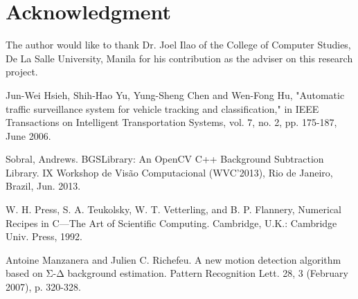 \documentclass[conference]{IEEEtran}
\begin{document}
\section*{Acknowledgment}

The author would like to thank Dr. Joel Ilao of the College of Computer Studies, De La Salle University, Manila for his contribution as the adviser on this research project.


\ifCLASSOPTIONcaptionsoff
  \newpage
\fi





%
%
%
\begin{thebibliography}{1}

Jun-Wei Hsieh, Shih-Hao Yu, Yung-Sheng Chen and Wen-Fong Hu, "Automatic traffic surveillance system for vehicle tracking and classification," in IEEE Transactions on Intelligent Transportation Systems, vol. 7, no. 2, pp. 175-187, June 2006.

Sobral, Andrews. BGSLibrary: An OpenCV C++ Background Subtraction Library. IX Workshop de Visão Computacional (WVC'2013), Rio de Janeiro, Brazil, Jun. 2013.

W. H. Press, S. A. Teukolsky, W. T. Vetterling, and B. P. Flannery, Numerical Recipes in C—The Art of Scientific Computing. Cambridge, U.K.: Cambridge Univ. Press, 1992.

Antoine Manzanera and Julien C. Richefeu. A new motion detection algorithm based on Σ-Δ background estimation. Pattern Recognition Lett. 28, 3 (February 2007), p. 320-328.
\end{thebibliography}
\end{document}
